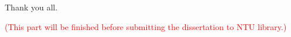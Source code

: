Thank you all.

\textcolor{red}{(This part will be finished before submitting the dissertation to NTU library.)}